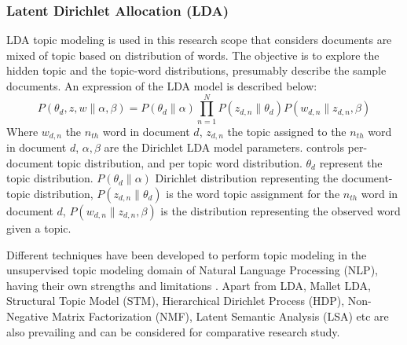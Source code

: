 \documentclass[sn-mathphys,Numbered]{sn-jnl}%
\theoremstyle{thmstyleone}%
\theoremstyle{thmstyletwo}%
\theoremstyle{thmstylethree}%
\begin{document}
\subsubsection{Latent Dirichlet Allocation (LDA)}
\label{lda_mdel}
LDA topic modeling \cite{jelodar_latent_2019, gupta_pan_lda_2021, pichardo_lagunas_svd_lda_2015, selvi_classification_2019} is used in this research scope that considers documents are mixed of topic based on distribution of words. The objective is to explore the hidden topic and the topic-word distributions, presumably describe the sample documents. An expression of the LDA model is described below:  
\begin{equation}
P(\theta_d,z,w\|\alpha,\beta)=P(\theta_d\|\alpha)\prod^N_{n=1}P(z_{d,n}\|\theta_d)P(w_{d,n}\|z_{d,n},\beta)
\end{equation}
Where $w_{d,n}$ the $n_{th}$ word in document $d$, $z_{d,n}$ the topic assigned to the $n_{th}$ word in document $d$, $\alpha,\beta$ are the Dirichlet LDA model parameters. controls per-document topic distribution, and per topic word distribution. $\theta_d$ represent the topic distribution. $P(\theta_d \| \alpha)$ Dirichlet 
distribution representing the document-topic distribution, $P(z_{d,n}\|\theta_d)$ is the word topic assignment for the $n_{th}$ word in document $d$, $P(w_{d,n}\|z_{d,n},\beta)$ is the distribution representing the observed word given a topic. 


Different techniques have been developed to perform topic modeling in the unsupervised topic modeling domain of Natural Language Processing (NLP), having their own strengths and limitations \cite{vayansky2020review, abdelrazek2022topic, yi2009comparative}. Apart from LDA, Mallet LDA, Structural Topic Model (STM), Hierarchical Dirichlet Process (HDP), Non-Negative Matrix Factorization (NMF), Latent Semantic Analysis (LSA) etc are also prevailing and can be considered for comparative research study.
\end{document}
